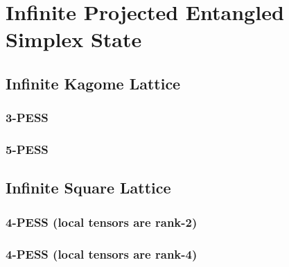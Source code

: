 \chapter{Infinite Projected Entangled Simplex State}
\label{chapter:ipess}

\section{Infinite Kagome Lattice}
\subsection{3-PESS}
\label{3pess}

\subsection{5-PESS}
\label{5pess}

\section{Infinite Square Lattice}
\subsection{4-PESS (local tensors are rank-2)}
\label{4pess2b}
\subsection{4-PESS (local tensors are rank-4)}
\label{4pess4b}

